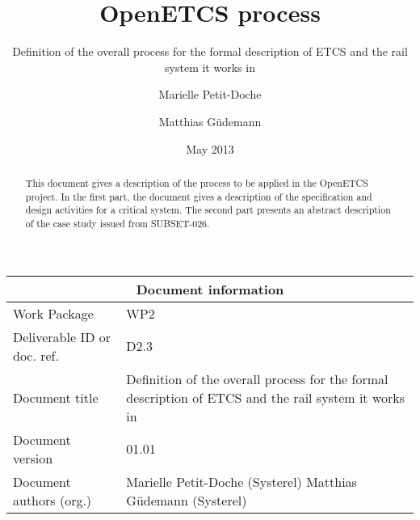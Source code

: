 \documentclass{template/openetcs_article}
\begin{document}
\frontmatter
{}




\title{OpenETCS process}

\subtitle{Definition of the overall process for the formal description of ETCS and the rail system it works in}

\date{May 2013}


\author{Marielle Petit-Doche}

\author{Matthias Güdemann}

 


\begin{abstract}
This document gives a description of the process to be applied in the OpenETCS project. In the first part, the document gives a description of the specification and design activities for a critical system. The second part presents an abstract description of the case study issued from SUBSET-026.

\end{abstract}

\maketitle
\tableofcontents
\listoffiguresandtables
\newpage


\begin{tabular}{|p{4.4cm}|p{8.7cm}|}
\hline
\multicolumn{2}{|c|}{Document information} \\
\hline
Work Package &  WP2  \\
Deliverable ID or doc. ref. & D2.3\\
\hline
Document title & Definition of the overall process for the formal description of ETCS and the rail system it works in \\
Document version & 01.01 \\
Document authors (org.)  & Marielle Petit-Doche (Systerel) Matthias Güdemann (Systerel) \\
\hline
\end{tabular}
\end{document}
